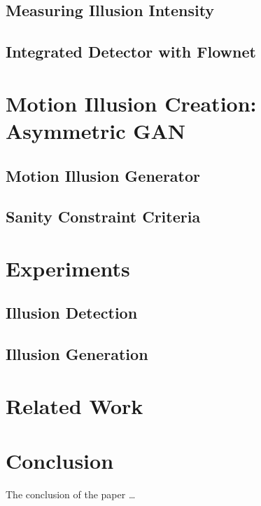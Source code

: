\documentclass[journal]{IEEEtran}
\begin{document}


\subsection{Measuring Illusion Intensity}
\label{sec:detection_measure}

\subsection{Integrated Detector with Flownet}
\label{sec:detection_idf}

\section{Motion Illusion Creation: Asymmetric GAN}
\label{sec:generation}

\subsection{Motion Illusion Generator}
\label{sec:generation_generator}

\subsection{Sanity Constraint Criteria}
\label{sec:generation_criteria}

\section{Experiments}
\label{sec:experiments}

\subsection{Illusion Detection}
\label{sec:experiments_detection}

\subsection{Illusion Generation}
\label{sec:experiments_generation}

\section{Related Work}
\label{sec:related}

\section{Conclusion}
\label{sec:conclusion}
The conclusion of the paper \dots





\end{document}
